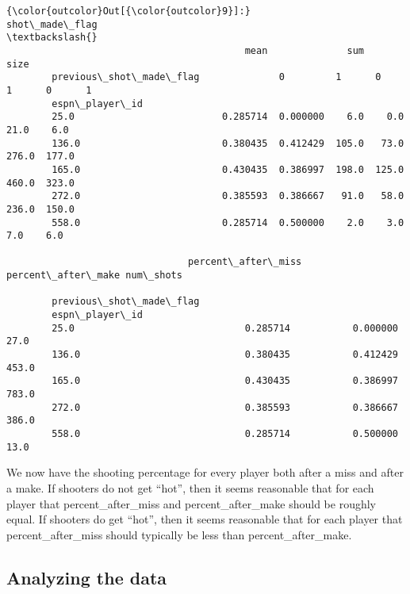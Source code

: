 \documentclass{article}
\begin{document}
            \begin{Verbatim}[commandchars=\\\{\}]
{\color{outcolor}Out[{\color{outcolor}9}]:}                         shot\_made\_flag                                        \textbackslash{}
                                          mean              sum          size          
        previous\_shot\_made\_flag              0         1      0      1      0      1   
        espn\_player\_id                                                                 
        25.0                          0.285714  0.000000    6.0    0.0   21.0    6.0   
        136.0                         0.380435  0.412429  105.0   73.0  276.0  177.0   
        165.0                         0.430435  0.386997  198.0  125.0  460.0  323.0   
        272.0                         0.385593  0.386667   91.0   58.0  236.0  150.0   
        558.0                         0.285714  0.500000    2.0    3.0    7.0    6.0   
        
                                percent\_after\_miss percent\_after\_make num\_shots  
                                                                                 
        previous\_shot\_made\_flag                                                  
        espn\_player\_id                                                           
        25.0                              0.285714           0.000000      27.0  
        136.0                             0.380435           0.412429     453.0  
        165.0                             0.430435           0.386997     783.0  
        272.0                             0.385593           0.386667     386.0  
        558.0                             0.285714           0.500000      13.0  
\end{Verbatim}
        
    We now have the shooting percentage for every player both after a miss
and after a make. If shooters do not get ``hot'', then it seems
reasonable that for each player that percent\_after\_miss and
percent\_after\_make should be roughly equal. If shooters do get
``hot'', then it seems reasonable that for each player that
percent\_after\_miss should typically be less than percent\_after\_make.


    \subsection{Analyzing the data}
\end{document}
